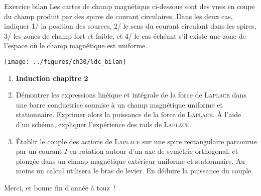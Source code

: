 \documentclass[a4paper, 11pt, final, garamond]{book}
\begin{document}
\noindent
\begin{texem}{Exercice bilan}
	Les cartes de champ magnétique ci-dessous sont des vues en coupe du champ
	produit par des spires de courant circulaires. Dans les deux cas, indiquer 1/ la
	position des sources, 2/ le sens du courant circulant dans les spires, 3/ les
	zones de champ fort et faible, et 4/ le cas échéant s'il existe une zone de
	l'espace où le champ magnétique est uniforme.
	\begin{center}
		\texttt{[image: ../figures/ch30/ldc\_bilan]}
	\end{center}
\end{texem}
\begin{enumerate}[resume, label=\sqenumi]
	\item[] \textbf{Induction chapitre 2}
	\item Démontrer les expressions linéique et intégrale de la force de
	      \textsc{Laplace} dans une barre conductrice soumise à un champ magnétique
	      uniforme et stationnaire. Exprimer alors la puissance de la force de
	      \textsc{Laplace}. À l'aide d'un schéma, expliquer l'expérience des rails de
	      \textsc{Laplace}.
	\item Établir le couple des actions de \textsc{Laplace} sur une spire
	      rectangulaire parcourue par un courant $I$ en rotation autour d'un axe de
	      symétrie orthogonal, et plongée dans un champ magnétique extérieur uniforme et
	      stationnaire. Au moins un calcul utilisera le bras de levier. En déduire la
	      puissance du couple.
\end{enumerate}

\vfill

\begin{center}
	\begin{framed}
		\Large
		Merci, et bonne fin d'année à touz~!
	\end{framed}
\end{center}

\vfill
\end{document}

